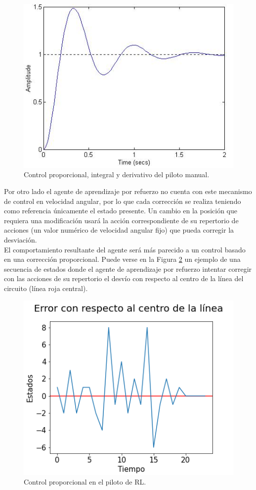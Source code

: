 \begin{figure}[ht!]
    \centering \includegraphics[width=0.5\columnwidth]{./figures/chapter_5/pid_control.jpg}
    \caption{Control proporcional, integral y derivativo del piloto manual.}\label{fig:pid_control}
\end{figure}

Por otro lado el agente de aprendizaje por refuerzo no cuenta con este mecanismo de control en velocidad angular, por lo que cada corrección se realiza teniendo como referencia únicamente el estado presente. Un cambio en la posición que requiera una modificación usará la acción correspondiente de su repertorio de acciones (un valor numérico de velocidad angular fijo) que pueda corregir la desviación.\\

El comportamiento resultante del agente será más parecido a un control basado en una corrección proporcional. Puede verse en la Figura \ref{fig:p_control} un ejemplo de una secuencia de estados donde el agente de aprendizaje por refuerzo intentar corregir con las acciones de su repertorio el desvío con respecto al centro de la línea del circuito (línea roja central).\\

\begin{figure}[ht!]
    \centering \includegraphics[width=0.5\columnwidth]{./figures/chapter_5/p_control.png}
    \caption{Control proporcional en el piloto de RL.}\label{fig:p_control}
\end{figure}

